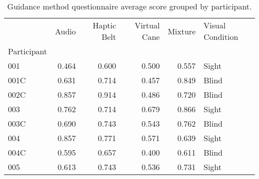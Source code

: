 
\begin{table}[!htb]
\centering
\caption{Guidance method questionnaire average score grouped by participant.}
\label{tab:questionnaire_average}
\begin{tabular}{lrrrrl}
\toprule
{} &  Audio &  Haptic Belt &  Virtual Cane &  Mixture & Visual Condition \\
Participant &        &              &               &          &                  \\
\midrule
001         &  0.464 &        0.600 &         0.500 &    0.557 &            Sight \\
001C        &  0.631 &        0.714 &         0.457 &    0.849 &            Blind \\
002C        &  0.857 &        0.914 &         0.486 &    0.720 &            Blind \\
003         &  0.762 &        0.714 &         0.679 &    0.866 &            Sight \\
003C        &  0.690 &        0.743 &         0.543 &    0.762 &            Blind \\
004         &  0.857 &        0.771 &         0.571 &    0.639 &            Sight \\
004C        &  0.595 &        0.657 &         0.400 &    0.611 &            Blind \\
005         &  0.613 &        0.743 &         0.536 &    0.731 &            Sight \\
\bottomrule
\end{tabular}
\end{table}

